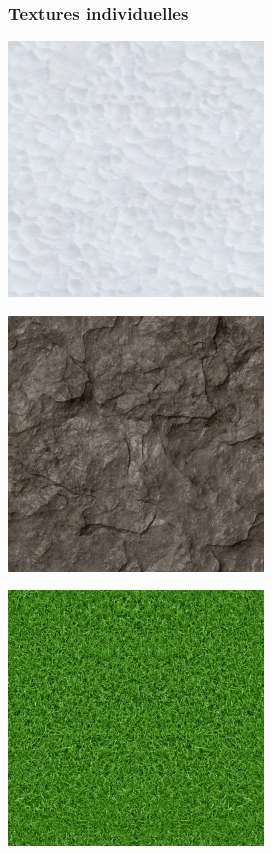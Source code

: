 \documentclass{article}
\begin{document}
\subsubsection{Textures individuelles}
\begin{minipage}[c]{0.46\linewidth}
\center
\includegraphics[scale=0.2]{../textures/snow.jpg}
\end{minipage}\hfill
\begin{minipage}[c]{0.46\linewidth}
\center
\includegraphics[scale=0.2]{../textures/rock.jpg}
\end{minipage}\hfill
\begin{minipage}[c]{0.46\linewidth}
\center
\includegraphics[scale=0.2]{../textures/grass.jpg}
\end{minipage}\hfill
\end{document}
